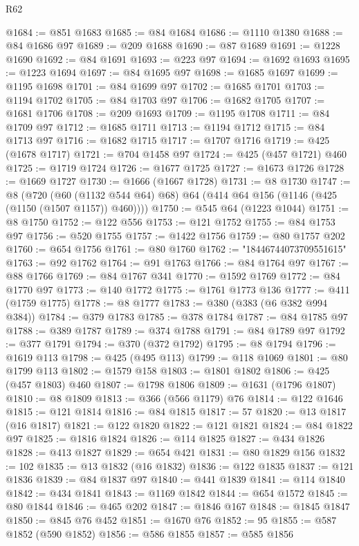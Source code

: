 \begin{lexlean}{R62}
\begin{coremodule}
@1684 := @851 @1683
@1685 := @84 @1684
@1686 := @1110 @1380
@1688 := @84 @1686 @97
@1689 := @209 @1688
@1690 := @87 @1689
@1691 := @1228 @1690
@1692 := @84 @1691
@1693 := @223 @97
@1694 := @1692 @1693
@1695 := @1223 @1694
@1697 := @84 @1695 @97
@1698 := @1685 @1697
@1699 := @1195 @1698
@1701 := @84 @1699 @97
@1702 := @1685 @1701
@1703 := @1194 @1702
@1705 := @84 @1703 @97
@1706 := @1682 @1705
@1707 := @1681 @1706
@1708 := @209 @1693
@1709 := @1195 @1708
@1711 := @84 @1709 @97
@1712 := @1685 @1711
@1713 := @1194 @1712
@1715 := @84 @1713 @97
@1716 := @1682 @1715
@1717 := @1707 @1716
@1719 := @425 (@1678 @1717)
@1721 := @704 @1458 @97
@1724 := @425 (@457 @1721) @460
@1725 := @1719 @1724
@1726 := @1677 @1725
@1727 := @1673 @1726
@1728 := @1669 @1727
@1730 := @1666 (@1667 @1728)
@1731 := @8 @1730
@1747 := @8
    (@720 (@60 (@1132 @544 @64) @68) @64 (@414 @64 @156 (@1146 (@425 (@1150 (@1507 @1157)) @460))))
@1750 := @545 @64 (@1223 @1044)
@1751 := @8 @1750
@1752 := @122 @556
@1753 := @121 @1752
@1755 := @84 @1753 @97
@1756 := @520 @1755
@1757 := @1422 @1756
@1759 := @80 @1757 @202
@1760 := @654 @1756
@1761 := @80 @1760
@1762 := "18446744073709551615"
@1763 := @92 @1762
@1764 := @91 @1763
@1766 := @84 @1764 @97
@1767 := @88 @1766
@1769 := @84 @1767 @341
@1770 := @1592 @1769
@1772 := @84 @1770 @97
@1773 := @140 @1772
@1775 := @1761 @1773 @136
@1777 := @411 (@1759 @1775)
@1778 := @8 @1777
@1783 := @380 (@383 (@6 @382 @994 @384))
@1784 := @379 @1783
@1785 := @378 @1784
@1787 := @84 @1785 @97
@1788 := @389 @1787
@1789 := @374 @1788
@1791 := @84 @1789 @97
@1792 := @377 @1791
@1794 := @370 (@372 @1792)
@1795 := @8 @1794
@1796 := @1619 @113
@1798 := @425 (@495 @113)
@1799 := @118 @1069
@1801 := @80 @1799 @113
@1802 := @1579 @158
@1803 := @1801 @1802
@1806 := @425 (@457 @1803) @460
@1807 := @1798 @1806
@1809 := @1631 (@1796 @1807)
@1810 := @8 @1809
@1813 := @366 (@566 @1179) @76
@1814 := @122 @1646
@1815 := @121 @1814
@1816 := @84 @1815
@1817 := 57
@1820 := @13 @1817 (@16 @1817)
@1821 := @122 @1820
@1822 := @121 @1821
@1824 := @84 @1822 @97
@1825 := @1816 @1824
@1826 := @114 @1825
@1827 := @434 @1826
@1828 := @413 @1827
@1829 := @654 @421
@1831 := @80 @1829 @156
@1832 := 102
@1835 := @13 @1832 (@16 @1832)
@1836 := @122 @1835
@1837 := @121 @1836
@1839 := @84 @1837 @97
@1840 := @441 @1839
@1841 := @114 @1840
@1842 := @434 @1841
@1843 := @1169 @1842
@1844 := @654 @1572
@1845 := @80 @1844
@1846 := @465 @202
@1847 := @1846 @167
@1848 := @1845 @1847
@1850 := @845 @76 @452
@1851 := @1670 @76
@1852 := 95
@1855 := @587 @1852 (@590 @1852)
@1856 := @586 @1855
@1857 := @585 @1856

\end{coremodule}
\end{lexlean}
